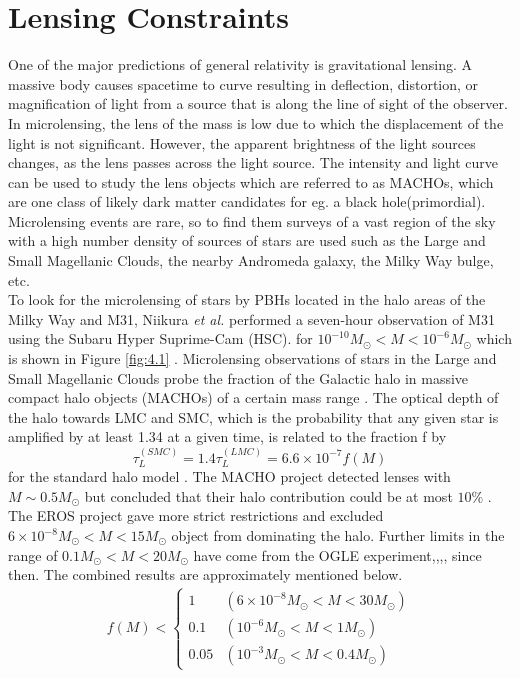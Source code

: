 \section{Lensing Constraints}
One of the major predictions of general relativity is gravitational lensing. A massive body causes spacetime to curve resulting in deflection, distortion, or magnification of light from a source that is along the line of sight of the observer.\\
In microlensing, the lens of the mass is low due to which the displacement of the light is not significant. However, the apparent brightness of the light sources changes, as the lens passes across the light source. The intensity and light curve can be used to study the lens objects which are referred to as MACHOs, which are one class of likely dark matter candidates for eg. a black hole(primordial). Microlensing events are rare, so to find them surveys of a vast region of the sky with a high number density of sources of stars are used such as the Large and Small Magellanic Clouds, the nearby Andromeda galaxy, the Milky Way bulge, etc. \\
To look for the microlensing of stars by PBHs located in the halo areas of the Milky Way and M31, Niikura \emph{et al.}\cite{Niikura:2017zjd} performed a seven-hour observation of M31 using the Subaru Hyper Suprime-Cam (HSC).
for $10^{-10}M_{\odot} < M < 10^{-6} M_{\odot}$ which is shown in Figure \ref{fig:4.1}  .
Microlensing observations of stars in the Large and Small Magellanic Clouds probe the fraction of the Galactic halo in massive compact halo objects (MACHOs) of a certain mass range \cite{1986ApJ...304...15B}. The optical depth of the halo towards LMC and SMC, which is the probability that any given star is amplified by at least 1.34 at a given time, is related to the fraction f by
\begin{equation}
    \tau_{L}^{(SMC)} = 1.4 \tau_{L}^{(LMC)} = 6.6 \times 10^{-7} f(M) \label{4.7}
\end{equation}
for the standard halo model \cite{MACHO:2000qbb}. The MACHO project detected lenses with $M \sim 0.5M_{\odot}$ but concluded that their halo contribution could be at most $10 \%$ \cite{Hamadache:2006fw}.
The EROS project gave more strict restrictions and excluded 
$ 6 \times 10^{-8}M_{\odot} < M < 15M_{\odot}$ object from dominating the halo. Further limits in the range of $ 0.1 M_{\odot} < M < 20M_{\odot} $ have come from the OGLE experiment\cite{Wyrzykowski_2009},\cite{Wyrzykowski_20111},\cite{Wyrzykowski_20112},\cite{Wyrzykowski_20113},\cite{CalchiNovati:2009kq} since then. The combined results are approximately mentioned below.\\
\begin{align}
    f(M)< \begin{cases}1 & \left(6 \times 10^{-8} M_{\odot}<M<30 M_{\odot}\right) \\ 0.1 & \left(10^{-6} M_{\odot}<M<1 M_{\odot}\right) \\ 0.05 & \left(10^{-3} M_{\odot}<M<0.4 M_{\odot}\right)\end{cases}
\end{align}
    
